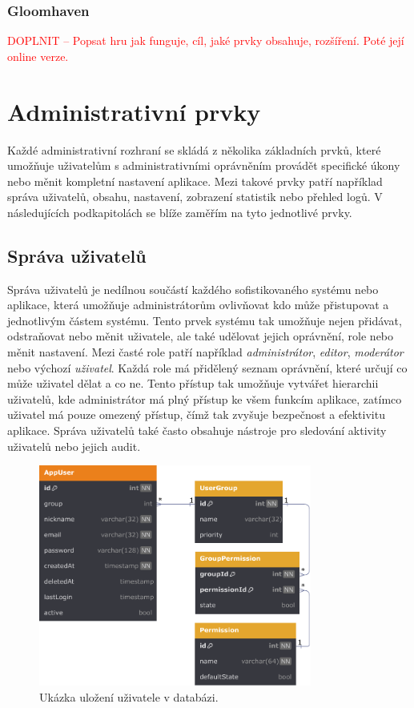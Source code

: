 \subsubsection{Gloomhaven}
\label{subsubsec:popular-board-games-analysis-gloomhaven}
\textcolor{red}{DOPLNIT -- Popsat hru jak funguje, cíl, jaké prvky obsahuje, rozšíření. Poté její online verze.}

\section{Administrativní prvky}
\label{sec:admin-elements}
Každé administrativní rozhraní se skládá z několika základních prvků, které umožňuje uživatelům s administrativními oprávněním provádět specifické úkony nebo měnit kompletní nastavení aplikace. Mezi takové prvky patří například správa uživatelů, obsahu, nastavení, zobrazení statistik nebo přehled logů. V následujících podkapitolách se blíže zaměřím na tyto jednotlivé prvky.

\subsection{Správa uživatelů}
\label{subsec:admin-elements-user-management}
Správa uživatelů je nedílnou součástí každého sofistikovaného systému nebo aplikace, která umožňuje administrátorům ovlivňovat kdo může přistupovat a jednotlivým částem systému. Tento prvek systému tak umožňuje nejen přidávat, odstraňovat nebo měnit uživatele, ale také udělovat jejich oprávnění, role nebo měnit nastavení. Mezi časté role patří například \textit{administrátor}, \textit{editor}, \textit{moderátor} nebo výchozí \textit{uživatel}. Každá role má přidělený seznam oprávnění, které určují co může uživatel dělat a co ne. Tento přístup tak umožňuje vytvářet hierarchii uživatelů, kde administrátor má plný přístup ke všem funkcím aplikace, zatímco uživatel má pouze omezený přístup, čímž tak zvyšuje bezpečnost a efektivitu aplikace. Správa uživatelů také často obsahuje nástroje pro sledování aktivity uživatelů nebo jejich audit.

\begin{figure}[H]
    \centering
    \includegraphics[width=0.8\textwidth]{figures/userManagement}
    \caption{Ukázka uložení uživatele v databázi. \cite{responsive_design}}
    \label{fig:user-management}
\end{figure}

